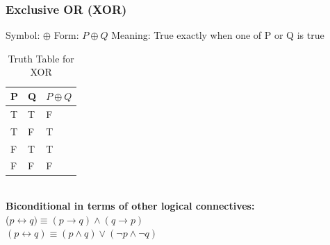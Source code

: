 \documentclass{article}
\begin{document}
\newpage
\subsubsection*{Exclusive OR (XOR)}
Symbol: $\oplus$ \hspace{1.5cm}
Form: $P \oplus Q$ \hspace{1.5cm}
Meaning:  True exactly when one of P or Q is true\\
\begin{table}[h]
\centering
\renewcommand{\arraystretch}{1.01}
\begin{tabular}{|>{\centering\arraybackslash}p{2cm}|>{\centering\arraybackslash}p{2cm}|>{\centering\arraybackslash}p{2cm}|}
\hline
P & Q &  $P \oplus Q$\\
\hline
T & T & F \\
\hline
T & F & T \\
\hline
F & T & T \\
\hline
F & F & F \\
\hline
\end{tabular}
\caption{Truth Table for XOR}
\end{table}\\
\textbf{Biconditional in terms of other logical connectives:}\\
($p \leftrightarrow q) \equiv (p \rightarrow q) \land (q \rightarrow p)$\\
$(p \leftrightarrow q) \equiv (p \land q) \lor (\neg p \land \neg q)$\\
\end{document}
